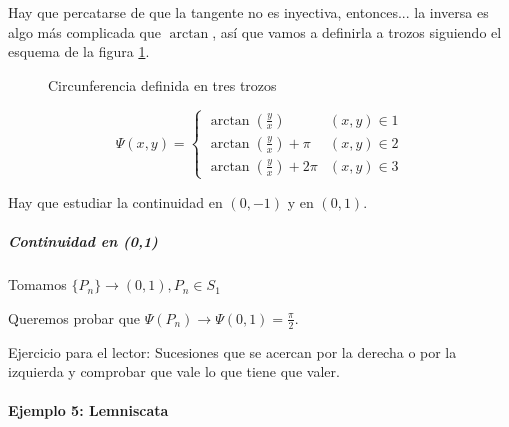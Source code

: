 Hay que percatarse de que la tangente no es inyectiva, entonces... la inversa es algo más complicada que $\arctan$, así que vamos a definirla a trozos siguiendo el esquema de la figura \ref{imgCirc_2}.

\begin{figure}[hbtp]
\begin{center}
\caption{Circunferencia definida en tres trozos}
\label{imgCirc_2}
\end{center}
\end{figure}


\[\Psi(x,y) =
\begin{cases}
\arctan\left(\frac{y}{x}\right) & (x,y)\in 1\\
\arctan\left(\frac{y}{x}\right) + \pi & (x,y) \in 2\\
\arctan\left(\frac{y}{x}\right)+2\pi& (x,y) \in 3
\end{cases}
\]

Hay que estudiar la continuidad en $(0,-1)$ y en $(0,1)$.

\subparagraph{Continuidad en (0,1)}

Tomamos $\{P_n\} \rightarrow (0,1), P_n \in S_1$

Queremos probar que $\Psi(P_n) \rightarrow \Psi(0,1) = \frac{\pi}{2}$.

Ejercicio para el lector: 
Sucesiones que se acercan por la derecha o por la izquierda y comprobar que vale lo que tiene que valer.		

\paragraph{Ejemplo 5: Lemniscata}

